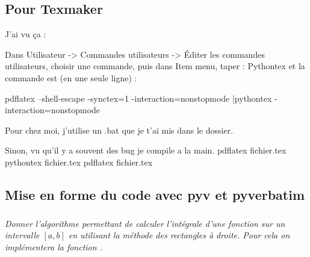 \documentclass[10pt,fleqn]{article} %
\begin{document}
\TPtrue \fichefalse \proffalse \tdfalse \coursfalse \collefalse
\corrigefalse
\graphicspath{{../../../style/png/}{images/}}


\def\xxactivite{\ifprof TP -- Corrigé  \else  Interro B \fi}
\def\xxauteur{\textsl{Émilien Durif -- Xavier Pessoles}}





\def\xxfigures{
}%




\setlength{\columnseprule}{.1pt}

\pagestyle{fancy}
\thispagestyle{plain}

\vspace{4.5cm}


\def\columnseprulecolor{\color{ocre}}
\setlength{\columnseprule}{0.4pt} 


\setcounter{exo}{0}
\vspace{2cm}

\subsection*{Pour Texmaker}
J'ai vu ça : 


Dans Utilisateur -> Commandes utilisateurs -> Éditer les commandes utilisateurs, choisir
une commande, puis dans Item menu, taper : Pythontex et la commande est (en une seule
ligne) :
\begin{pyverbatim}
pdflatex --shell-escape -synctex=1 -interaction=nonstopmode %
|pythontex %
-interaction=nonstopmode %
\end{pyverbatim}

Pour chez moi, j'utilise un .bat que je t'ai mis dans le dossier.

Sinon, vu qu'il y a souvent des bug je compile a la main.
pdflatex fichier.tex
pythontex fichier.tex
pdflatex fichier.tex


\subsection*{Mise en forme du code avec pyv et pyverbatim}

\subparagraph{}\textit{Donner l'algorithme permettant de calculer l'intégrale d'une fonction sur un intervalle $[a,b]$ en utilisant la méthode des rectangles à droite. Pour cela on implémentera la fonction 
.}
\end{document}
